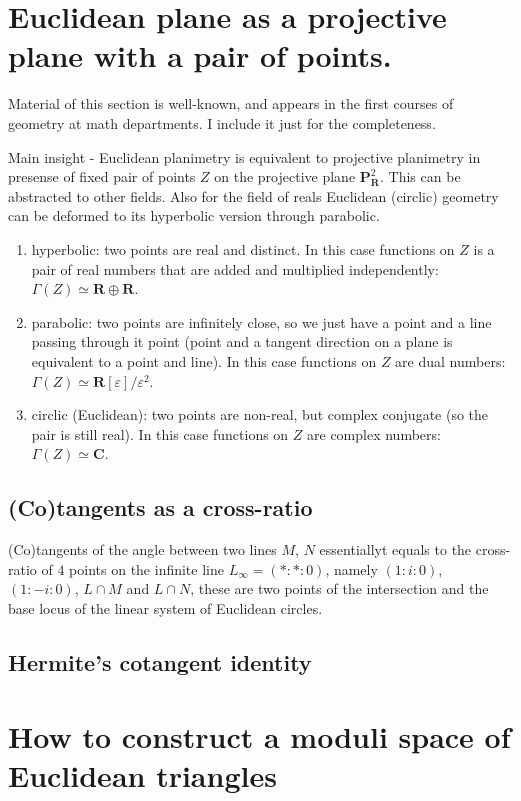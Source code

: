\documentclass[12pt]{article}
\numberwithin{equation}{section}
\renewcommand\C{\mathbf{C}}                  %
\renewcommand\P{\mathbf{P}}                  %
\newcommand\R{\mathbf{R}}                    %
\begin{document}
\section{Euclidean plane as a projective plane with a pair of points.}
Material of this section is well-known,
and appears in the first courses of geometry at math departments.
I include it just for the completeness.

Main insight - Euclidean planimetry is equivalent to
projective planimetry in presense of fixed pair of points $Z$
on the projective plane $\P^2_\R$. This can be abstracted to other fields.
Also for the field of reals Euclidean (circlic) geometry 
can be deformed to its hyperbolic version through parabolic.
\begin{enumerate}
\item hyperbolic: two points are real and distinct.
In this case functions on $Z$ is a pair of real numbers that are added and multiplied independently:
$Γ(Z) \simeq \R\oplus\R$.
\item parabolic: two points are infinitely close, so we just have
a point and a line passing through it point (point and a tangent direction
on a plane is equivalent to a point and line). In this case functions on $Z$ are dual numbers: $Γ(Z) \simeq \R[ε]/ε^2$.
\item circlic (Euclidean): two points are non-real, but complex conjugate
(so the pair is still real).
In this case functions on $Z$ are complex numbers:
$Γ(Z) \simeq \C$.
\end{enumerate}

\subsection{(Co)tangents as a cross-ratio}
(Co)tangents of the angle between two lines $M$, $N$
essentiallyt equals to the cross-ratio of $4$ points on
the infinite line $L_\infty = (*:*:0)$, 
namely $(1:i:0)$, $(1:-i:0)$, $L\cap M$ and $L\cap N$,
these are two points of the intersection
and the base locus of the linear system of Euclidean circles.

\subsection{Hermite's cotangent identity}

\section{How to construct a moduli space of Euclidean triangles}
\end{document}
